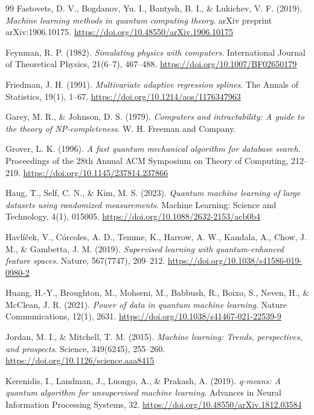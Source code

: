 \begin{thebibliography}{99}
	Fastovets, D. V., Bogdanov, Yu. I., Bantysh, B. I., \& Lukichev, V. F. (2019).
	\emph{Machine learning methods in quantum computing theory}.
	arXiv preprint arXiv:1906.10175.
	\url{https://doi.org/10.48550/arXiv.1906.10175}

	Feynman, R. P. (1982).
	\emph{Simulating physics with computers}.
	International Journal of Theoretical Physics, 21(6--7), 467--488.
	\url{https://doi.org/10.1007/BF02650179}

	Friedman, J. H. (1991).
	\emph{Multivariate adaptive regression splines}.
	The Annals of Statistics, 19(1), 1--67.
	\url{https://doi.org/10.1214/aos/1176347963}

	Garey, M. R., \& Johnson, D. S. (1979).
	\emph{Computers and intractability: A guide to the theory of NP-completeness}.
	W. H. Freeman and Company.

	Grover, L. K. (1996).
	\emph{A fast quantum mechanical algorithm for database search}.
	Proceedings of the 28th Annual ACM Symposium on Theory of Computing, 212--219.
	\url{https://doi.org/10.1145/237814.237866}

	Haug, T., Self, C. N., \& Kim, M. S. (2023).
	\emph{Quantum machine learning of large datasets using randomized measurements}.
	Machine Learning: Science and Technology, 4(1), 015005.
	\url{https://doi.org/10.1088/2632-2153/acb0b4}

	Havlíček, V., Córcoles, A. D., Temme, K., Harrow, A. W., Kandala, A., Chow, J. M., \& Gambetta, J. M. (2019).
	\emph{Supervised learning with quantum-enhanced feature spaces}.
	Nature, 567(7747), 209--212.
	\url{https://doi.org/10.1038/s41586-019-0980-2}

	Huang, H.-Y., Broughton, M., Mohseni, M., Babbush, R., Boixo, S., Neven, H., \& McClean, J. R. (2021).
	\emph{Power of data in quantum machine learning}.
	Nature Communications, 12(1), 2631.
	\url{https://doi.org/10.1038/s41467-021-22539-9}

	Jordan, M. I., \& Mitchell, T. M. (2015).
	\emph{Machine learning: Trends, perspectives, and prospects}.
	Science, 349(6245), 255--260.
	\url{https://doi.org/10.1126/science.aaa8415}

	Kerenidis, I., Landman, J., Luongo, A., \& Prakash, A. (2019).
	\emph{q-means: A quantum algorithm for unsupervised machine learning}.
	Advances in Neural Information Processing Systems, 32.
	\url{https://doi.org/10.48550/arXiv.1812.03584}


\end{thebibliography}
